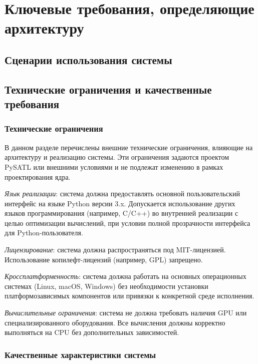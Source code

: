 \chapter{Ключевые требования, определяющие архитектуру}

\section{Сценарии использования системы}

\section{Технические ограничения и качественные требования}
\subsection{Технические ограничения}
В данном разделе перечислены внешние технические ограничения, влияющие на архитектуру и реализацию системы. Эти ограничения задаются проектом PySATL или внешними условиями и не подлежат изменению в рамках проектирования ядра.

\begin{itemizecmp}
    \item \textit{Язык реализации}: система должна предоставлять основной пользовательский интерфейс на языке Python версии 3.x. Допускается использование других языков программирования (например, C/C++) во внутренней реализации с целью оптимизации вычислений, при условии полной прозрачности интерфейса для Python-пользователя.
    \item \textit{Лицензирование}: система должна распространяться под MIT-лицензией. Использование копилефт-лицензий (например, GPL) запрещено.
    \item \textit{Кроссплатформенность}: система должна работать на основных операционных системах (Linux, macOS, Windows) без необходимости установки платформозависимых компонентов или привязки к конкретной среде исполнения.
    \item \textit{Вычислительные ограничения}: система не должна требовать наличия GPU или специализированного оборудования. Все вычисления должны корректно выполняться на CPU без дополнительных зависимостей. 
\end{itemizecmp}

\subsection{Качественные характеристики системы}

